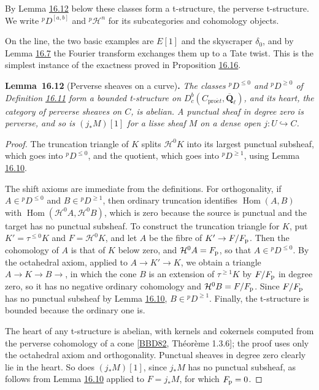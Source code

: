 \documentclass[11pt]{article}
\newenvironment{bpstatement}[2]{\par\addvspace{0.6\baselineskip}\noindent\textbf{#1}#2\textbf{.}\enspace\ignorespaces}
  {\par\addvspace{0.4\baselineskip}}
\newenvironment{bpstatementit}[2]{\begin{bpstatement}{#1}{#2}\itshape\ignorespaces}{\end{bpstatement}}
\providecommand{\Hom}{}\renewcommand{\Hom}{\operatorname{Hom}}
\begin{document}
\label{bp202}%
By Lemma \hyperref[bp203]{16.12} below these classes form a t-structure, the perverse t-structure. We write \({}^pD^{[a,b]}\) and \({}^p\mathcal H^n\) for its subcategories and cohomology objects.

On the line, the two basic examples are \(E[1]\) and the skyscraper \(\delta_0\), and by Lemma \hyperref[bp188]{16.7} the Fourier transform exchanges them up to a Tate twist. This is the simplest instance of the exactness proved in Proposition \hyperref[bp214]{16.16}.

\label{bp203}%
\begin{bpstatementit}{Lemma~16.12}{ (Perverse sheaves on a curve)}
The classes \({}^pD^{\le0}\) and \({}^pD^{\ge0}\) of Definition \hyperref[bp201]{16.11} form a bounded t-structure on \(D^b_c(C_{\mathrm{pro}\acute{e}t},\overline{\mathbf Q}_\ell)\), and its heart, the category of perverse sheaves on \(C\), is abelian. A punctual sheaf in degree zero is perverse, and so is \((j_*M)[1]\) for a lisse sheaf \(M\) on a dense open \(j:U\hookrightarrow C\).
\end{bpstatementit}

\begin{proof}[{Proof}]\label{bp204}%
The truncation triangle of \(K\) splits \(\mathcal H^0K\) into its largest punctual subsheaf, which goes into \({}^pD^{\le0}\), and the quotient, which goes into \({}^pD^{\ge1}\), using Lemma \hyperref[bp199]{16.10}.

The shift axioms are immediate from the definitions. For orthogonality, if \(A\in{}^pD^{\le0}\) and \(B\in{}^pD^{\ge1}\), then ordinary truncation identifies \(\Hom(A,B)\) with \(\Hom(\mathcal H^0A,\mathcal H^0B)\), which is zero because the source is punctual and the target has no punctual subsheaf. To construct the truncation triangle for \(K\), put \(K'=\tau^{\le0}K\) and \(F=\mathcal H^0K\), and let \(A\) be the fibre of \(K'\to F/F_{\rm p}\). Then the cohomology of \(A\) is that of \(K\) below zero, and \(\mathcal H^0A=F_{\rm p}\), so that \(A\in{}^pD^{\le0}\). By the octahedral axiom, applied to \(A\to K'\to K\), we obtain a triangle \(A\to K\to B\to\), in which the cone \(B\) is an extension of \(\tau^{\ge1}K\) by \(F/F_{\rm p}\) in degree zero, so it has no negative ordinary cohomology and \(\mathcal H^0B=F/F_{\rm p}\). Since \(F/F_{\rm p}\) has no punctual subsheaf by Lemma \hyperref[bp199]{16.10}, \(B\in{}^pD^{\ge1}\). Finally, the t-structure is bounded because the ordinary one is.

The heart of any t-structure is abelian, with kernels and cokernels computed from the perverse cohomology of a cone [\hyperref[bp353]{BBD82}, Théorème 1.3.6]; the proof uses only the octahedral axiom and orthogonality. Punctual sheaves in degree zero clearly lie in the heart. So does \((j_*M)[1]\), since \(j_*M\) has no punctual subsheaf, as follows from Lemma \hyperref[bp199]{16.10} applied to \(F=j_*M\), for which \(F_{\rm p}=0\).
\end{proof}
\end{document}
